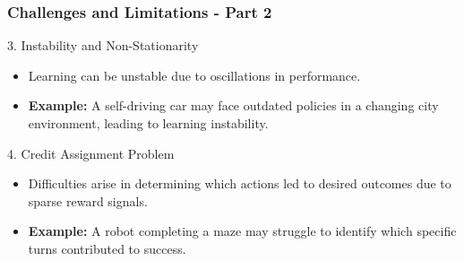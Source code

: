 \documentclass[aspectratio=169]{beamer}
\begin{document}
\begin{frame}[fragile]
    \frametitle{Challenges and Limitations - Part 2}
    \begin{block}{3. Instability and Non-Stationarity}
        \begin{itemize}
            \item Learning can be unstable due to oscillations in performance.
            \item \textbf{Example:} A self-driving car may face outdated policies in a changing city environment, leading to learning instability.
        \end{itemize}
    \end{block}

    \begin{block}{4. Credit Assignment Problem}
        \begin{itemize}
            \item Difficulties arise in determining which actions led to desired outcomes due to sparse reward signals.
            \item \textbf{Example:} A robot completing a maze may struggle to identify which specific turns contributed to success.
        \end{itemize}
    \end{block}
\end{frame}
\end{document}
